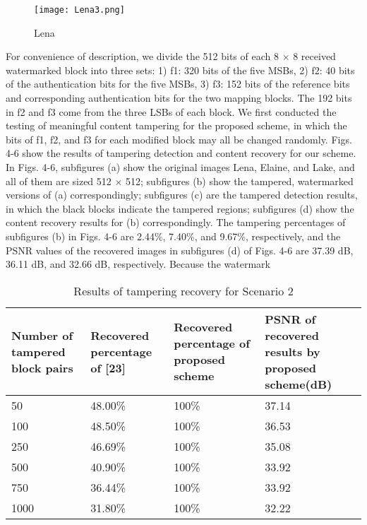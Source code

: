 \documentclass[draft, {\secondLanguage}, english]{volcanica-template}
\begin{document}
\begin{figure}
        \centering
        \texttt{[image: Lena3.png]}
        \caption{Lena}
        \label{Lena}
    \end{figure}

    For convenience of description, we divide the 512 bits of each 8 $\times $ 8 received watermarked block into three sets: 1) f1: 320 bits of the five MSBs, 2) f2: 40 bits of the authentication bits for the five MSBs, 3) f3: 152 bits of the reference bits and corresponding authentication bits for the two mapping blocks. The 192 bits in f2 and f3 come from the three LSBs of each block. We first conducted the testing of meaningful content tampering for the proposed scheme, in which the bits of f1, f2, and f3 for each modified block may all be changed randomly. Figs. 4-6 show the results of tampering detection and content recovery for our scheme. In Figs. 4-6, subfigures (a) show the original images Lena, Elaine, and Lake, and all of them are sized 512 $\times$ 512; subfigures (b) show the tampered, watermarked versions of (a) correspondingly; subfigures (c) are the tampered detection results, in which the black blocks indicate the tampered regions; subfigures (d) show the content recovery results for (b) correspondingly. The tampering percentages of subfigures (b) in Figs. 4-6 are 2.44\%, 7.40\%, and 9.67\%, respectively, and the PSNR values of the recovered images in subfigures (d) of Figs. 4-6 are 37.39 dB, 36.11 dB, and 32.66 dB, respectively. Because the watermark

\begin{table}[!thbp]
\centering
\caption{Results of tampering recovery for Scenario 2}
\begin{tabularx}{\textwidth}{
|X|X|X|X|
}
\toprule	
{Number of tampered block pairs} & {Recovered percentage of [23]} & {Recovered percentage of proposed scheme} &{PSNR of recovered results by proposed scheme(dB)}\\	
\midrule										
50 & 48.00\% & 100\% & 37.14\\
\hline
100 &48.50\% & 100\% & 36.53\\
\hline
250	&46.69\% & 100\% & 35.08\\
\hline
500 &40.90\% & 100\% & 33.92\\
\hline
750 &36.44\% & 100\% & 33.92\\
\hline
1000 &31.80\% & 100\% & 32.22\\
\hline
							
\end{tabularx}
\label{tab:01}
\end{table}
\end{document}
